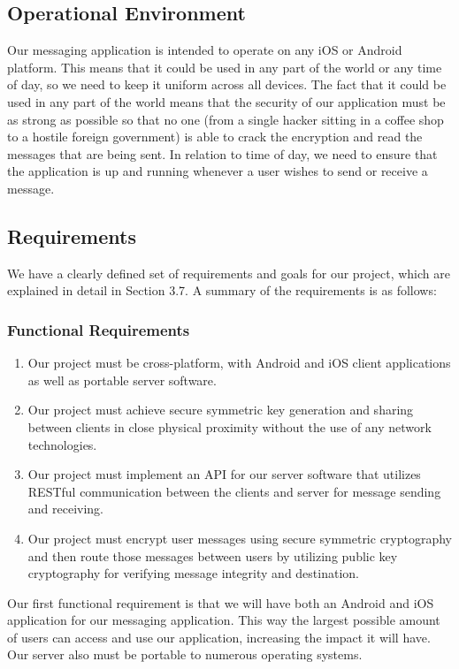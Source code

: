\documentclass[11pt]{article}
\begin{document}
\subsection{Operational Environment}
Our messaging application is intended to operate on any iOS or Android platform. This means that it could be used in any part of the world or any time of day, so we need to keep it uniform across all devices. The fact that it could be used in any part of the world means that the security of our application must be as strong as possible so that no one (from a single hacker sitting in a coffee shop to a hostile foreign government) is able to crack the encryption and read the messages that are being sent. In relation to time of day, we need to ensure that the application is up and running whenever a user wishes to send or receive a message. \\

\subsection{Requirements}
We have a clearly defined set of requirements and goals for our project, which are explained in detail in Section 3.7. A summary of the requirements is as follows:

\subsubsection*{Functional Requirements}
\begin{enumerate}
	\item{Our project must be cross-platform, with Android and iOS client applications as well as portable server software.}
	\item{Our project must achieve secure symmetric key generation and sharing between clients in close physical proximity without the use of any network technologies.}
	\item{Our project must implement an API for our server software that utilizes RESTful communication between the clients and server for message sending and receiving.}
	\item{Our project must encrypt user messages using secure symmetric cryptography and then route those messages between users by utilizing public key cryptography for verifying message integrity and destination.}
\end{enumerate}

Our first functional requirement is that we will have both an Android and iOS application for our messaging application. This way the largest possible amount of users can access and use our application, increasing the impact it will have. Our server also must be portable to numerous operating systems.\\
\end{document}
